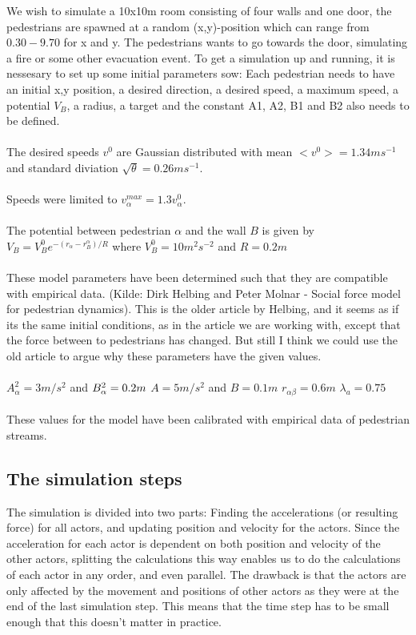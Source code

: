 We wish to simulate a 10x10m room consisting of four walls and one door, the pedestrians are spawned at a random (x,y)-position which can range from $0.30 - 9.70$ for x and y. The pedestrians wants to go towards the door, simulating a fire or some other evacuation event. To get a simulation up and running, it is nessesary to set up some initial parameters sow: Each pedestrian needs to have an initial x,y position, a desired direction, a desired speed, a maximum speed, a potential $V_B$, a radius, a target and the constant A1, A2, B1 and B2 also needs to be defined.\\\\
\noindent
The desired speeds $v^0$ are Gaussian distributed with mean $<v^0> = 1.34ms^{-1}$ and standard diviation $\sqrt{\theta} = 0.26ms^{-1}$. \\\\
Speeds were limited to $v_\alpha^{max}=1.3 v_\alpha^0$.\\\\
\noindent
The potential between pedestrian $\alpha$ and the wall $B$ is given by $V_B=V_B^0 e^{-(r_\alpha - r_B^\alpha )/R}$ where $V_B^0 = 10m^2s^{-2}$ and $R=0.2m$\\\\
\noindent
These model parameters have been determined such that they are compatible with empirical data. (Kilde: Dirk Helbing and Peter Molnar - Social force model for pedestrian dynamics). This is the older article by Helbing, and it seems as if its the same initial conditions, as in the article we are working with, except that the force between to pedestrians has changed. But still I think we could use the old article to argue why these parameters have the given values.\\\\
\noindent
$A^2_\alpha = 3m/s^2$ and $B^2_\alpha = 0.2 m\\$
$A = 5 m/s^2$ and $B=0.1m$
$r_{\alpha \beta} = 0.6m$
$\lambda_a = 0.75$\\\\
\noindent
These values for the model have been calibrated with empirical data of pedestrian streams.

\subsection{The simulation steps}
The simulation is divided into two parts: Finding the accelerations (or 
resulting force) for all actors, and updating position and velocity for the 
actors.  Since the acceleration for each actor is dependent on both position 
and velocity of the other actors, splitting the calculations this way enables 
us to do the calculations of each actor in any order, and even parallel. The 
drawback is that the actors are only affected by the movement and positions of 
other actors as they were at the end of the last simulation step. This means 
that the time step has to be small enough that this doesn't matter in 
practice.

